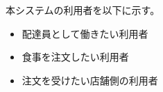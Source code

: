 本システムの利用者を以下に示す。
\begin{itemize}
\item 配達員として働きたい利用者

\item 食事を注文したい利用者

\item 注文を受けたい店舗側の利用者
\end{itemize}